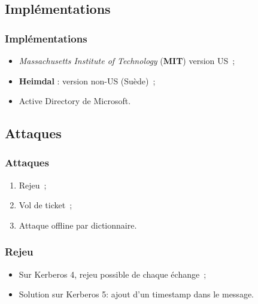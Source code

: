 \documentclass[svgnames]{beamer}
\begin{document}
\subsection{Implémentations}

\begin{frame}
  \frametitle{Implémentations}
  
  \begin{itemize}
   \item \textit{Massachusetts Institute of Technology} (\textbf{MIT}) version US~; %
   \item \textbf{Heimdal} : version non-US (Suède)~; %
   \item Active Directory de Microsoft.
  \end{itemize}
\end{frame}


\subsection{Attaques}

\begin{frame}
 \frametitle{Attaques}
 
 \begin{enumerate}
  \item Rejeu~;
  \item Vol de ticket~;
  \item Attaque offline par dictionnaire.
 \end{enumerate}

\end{frame}

\begin{frame}
 \frametitle{Rejeu}
 
 \begin{itemize}
   \item Sur Kerberos 4, rejeu possible de chaque échange~;
   \item Solution sur Kerberos 5: ajout d'un timestamp dans le message.
  \end{itemize}
\end{frame}
\end{document}
